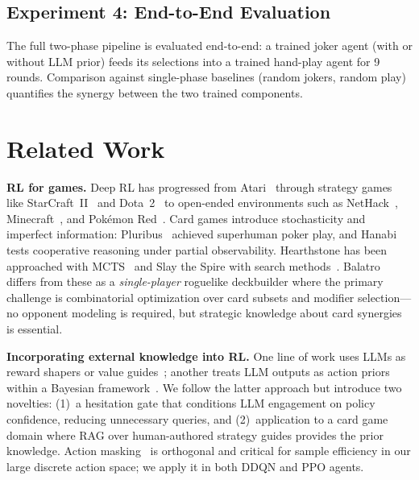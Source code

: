\documentclass[conference]{IEEEtran}
\begin{document}
\subsection{Experiment 4: End-to-End Evaluation}

The full two-phase pipeline is evaluated end-to-end: a trained joker agent (with or without LLM prior) feeds its selections into a trained hand-play agent for 9 rounds.
Comparison against single-phase baselines (random jokers, random play) quantifies the synergy between the two trained components.

\section{Related Work}
\label{sec:related}

\textbf{RL for games.}
Deep RL has progressed from Atari~\cite{mnih2015human} through strategy games like StarCraft~II~\cite{vinyals2019grandmaster} and Dota~2~\cite{berner2019dota} to open-ended environments such as NetHack~\cite{kuttler2020nethack}, Minecraft~\cite{guss2019minerl}, and Pok\'emon Red~\cite{pleines2025pokemon}.
Card games introduce stochasticity and imperfect information: Pluribus~\cite{brown2019superhuman} achieved superhuman poker play, and Hanabi~\cite{bard2020hanabi} tests cooperative reasoning under partial observability.
Hearthstone has been approached with MCTS~\cite{santos2017monte} and Slay the Spire with search methods~\cite{saavedraSTS2024}.
Balatro differs from these as a \textit{single-player} roguelike deckbuilder where the primary challenge is combinatorial optimization over card subsets and modifier selection---no opponent modeling is required, but strategic knowledge about card synergies is essential.

\textbf{Incorporating external knowledge into RL.}
One line of work uses LLMs as reward shapers or value guides~\cite{zhang2024llmguide}; another treats LLM outputs as action priors within a Bayesian framework~\cite{yan2024efficient, levine2018reinforcement}. We follow the latter approach but introduce two novelties: (1)~a hesitation gate that conditions LLM engagement on policy confidence, reducing unnecessary queries, and (2)~application to a card game domain where RAG over human-authored strategy guides provides the prior knowledge.
Action masking~\cite{huang2022closer} is orthogonal and critical for sample efficiency in our large discrete action space; we apply it in both DDQN and PPO agents.
\end{document}
